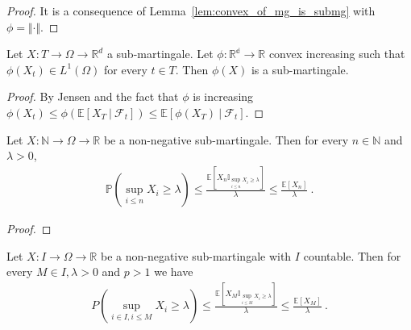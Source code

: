 \begin{proof}
It is a consequence of Lemma~\ref{lem:convex_of_mg_is_submg} with $\phi = \Vert \cdot \Vert$.
\end{proof}


\begin{lemma}\label{lem:convex_of_submg_is_submg}
Let $X : T  \rightarrow \Omega \rightarrow \mathbb{R}^d$ a sub-martingale.
Let $\phi:\mathbb{R^d} \rightarrow \mathbb{R}$ convex increasing such that
$\phi(X_t)\in L^1(\Omega)$ for every $t\in T$. Then $\phi(X)$ is a sub-martingale.
\end{lemma}

\begin{proof}
  By Jensen and the fact that $\phi$ is increasing
  $\phi(X_t) \leq \phi\left( \mathbb{E}[X_T\ |\ \mathcal{F}_t] \right)\leq \mathbb{E}[\phi(X_T)\ |\ \mathcal{F}_t]$.
\end{proof}


\begin{lemma}\label{lem:maximal_ineq}
  \mathlibok
Let $X : \mathbb{N} \rightarrow \Omega \rightarrow \mathbb{R}$ be a non-negative sub-martingale.
Then for every $n \in \mathbb{N}$ and $\lambda > 0$,
\begin{align*}
  \mathbb{P}\left(\sup_{i \le n}X_i\geq\lambda \right)
  \le \frac{\mathbb{E}\left[X_n \mathbb{I}_{\sup_{i \le n}X_i \ge \lambda}\right]}{\lambda}
  \le \frac{\mathbb{E}[X_n]}{\lambda}
  \: .
\end{align*}
\end{lemma}

\begin{proof}\leanok

\end{proof}


\begin{lemma}\label{lem:doob_countable}
  Let $X : I \rightarrow \Omega \rightarrow \mathbb{R}$ be a non-negative sub-martingale with $I$ countable.
  Then for every $M \in I,\lambda > 0$ and $p>1$ we have
  \begin{align*}
    P\left( \sup_{i\in I, i\leq M}X_i\geq\lambda \right)
    \le \frac{\mathbb{E}\left[X_M \mathbb{I}_{\sup_{i \le M}X_i \ge \lambda}\right]}{\lambda}
    \le \frac{\mathbb{E}[X_M]}{\lambda}
    \: .
  \end{align*}
\end{lemma}

